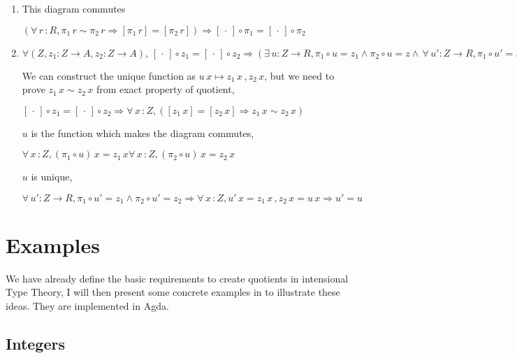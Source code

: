 \documentclass[envcountsame]{llncs}
\newcommand{\dotph}{\,\cdot\,}
\providecommand{\class}[1]{[#1]}
\begin{document}
\begin{enumerate}

\item This diagram commutes

$(\forall \,r\, \colon R, \pi_1 \, r \sim \pi_2 \, r \Rightarrow\class{\pi_1 \,r} = \class{\pi_2 \, r}) \Rightarrow \class\dotph \circ \pi_1 = \class\dotph\circ \pi_2$


\item $\forall (Z , z_1 \colon Z \to A, z_2 \colon Z \to A), \, \class{\dotph} \circ z_1 = \class\dotph \circ z_2 

\Rightarrow( \exists \,u : Z \to R, \pi_1 \circ u = z_1 \wedge  \pi_2 \circ u = z


\wedge \,\forall \,u' \colon Z \to R, \pi_1 \circ u' = z_1 \wedge  \pi_2 \circ u' = z_2 

\Rightarrow u = u')$

We  can construct the unique function as $u \,x \mapsto z_1 \,x \,, z_2\, x$, but we need to prove $z_1 \,x\sim z_2 \,x$ from exact property of quotient, 

$\class{\dotph} \circ z_1 = \class\dotph \circ z_2 \Rightarrow \forall \,x\, \colon Z, (\class{z_1\,x}=\class{z_2 \,x} \Rightarrow z_{1} \,x \sim z_2 \, x) $

$u$ is the function which makes the diagram commutes,

$\forall \,x\,\colon Z, (\pi_1 \circ u) \, x = z_1 \,x

\forall \,x\,\colon Z, (\pi_2 \circ u) \, x = z_2 \,x$

$u$ is unique,

$\forall \,u' \colon Z \to R, \pi_1 \circ u' = z_1 \wedge  \pi_2 \circ u'  = z_2 
 
 \Rightarrow \forall \,x\,\colon Z, u' \,x = z_1 \,x\,,z_2\,x=u\,x \Rightarrow u' = u$


\end{enumerate}


\section{Examples}
We have already define the basic requirements to create quotients in intensional Type Theory, I will then present some concrete examples in \cite{nuo:10} to illustrate these ideas. They are implemented in Agda. 

\subsection{Integers}
\end{document}

